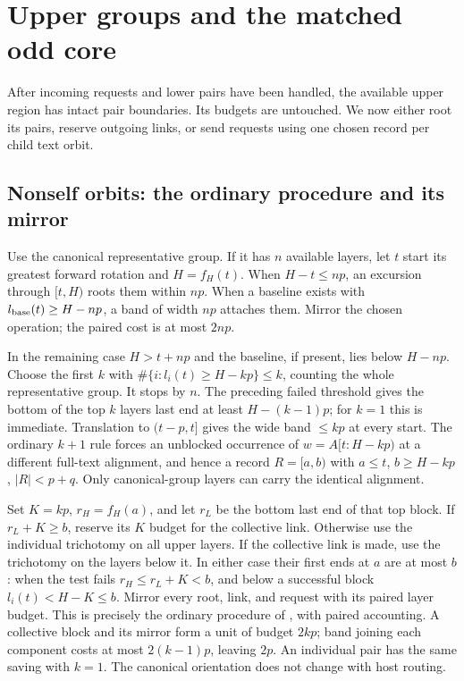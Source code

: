\section{Upper groups and the matched odd core}\label{sec:groups}
After incoming requests and lower pairs have been handled, the available
upper region has intact pair boundaries. Its budgets are untouched.
We now either root its pairs, reserve outgoing links, or send requests
using one chosen record per child text orbit.

\subsection{Nonself orbits: the ordinary procedure and its mirror}\label{sec:nonself}
Use the canonical representative group. If it has $n$ available layers,
let $t$ start its greatest forward rotation and $H=f_H(t)$.
When $H-t\le np$, an excursion through $[t,H)$ roots them within $np$.
When a baseline exists with $l_{\rm base}(t)\ge H-np$, a band of width
$np$ attaches them. Mirror the chosen operation; the paired cost is
at most $2np$.

In the remaining case $H>t+np$ and the baseline, if present, lies below
$H-np$. Choose the first $k$ with
$\#\{i:l_i(t)\ge H-kp\}\le k$, counting the whole representative group.
It stops by $n$. The preceding failed threshold gives the bottom of
the top $k$ layers last end at least $H-(k-1)p$; for $k=1$ this is
immediate. Translation to $(t-p,t]$ gives the wide band $\le kp$ at
every start. The ordinary $k+1$ rule forces an unblocked occurrence
of $w=A[t:H-kp)$ at a different full-text alignment, and hence a record
$R=[a,b)$ with $a\le t$, $b\ge H-kp$, $|R|<p+q$.
Only canonical-group layers can carry the identical alignment.

Set $K=kp$, $r_H=f_H(a)$, and let $r_L$ be the bottom last end of
that top block. If $r_L+K\ge b$, reserve its $K$ budget for the
collective link. Otherwise use the individual trichotomy on all upper
layers. If the collective link is made, use the trichotomy on the layers
below it. In either case their first ends at $a$ are at most $b$:
when the test fails $r_H\le r_L+K<b$, and below a successful block
$l_i(t)<H-K\le b$. Mirror every root, link, and request with its
paired layer budget. This is precisely the ordinary procedure of
, with paired accounting. A collective block and its
mirror form a unit of budget $2kp$; band joining each component costs
at most $2(k-1)p$, leaving $2p$. An individual pair has the same saving
with $k=1$. The canonical orientation does not change with host routing.

